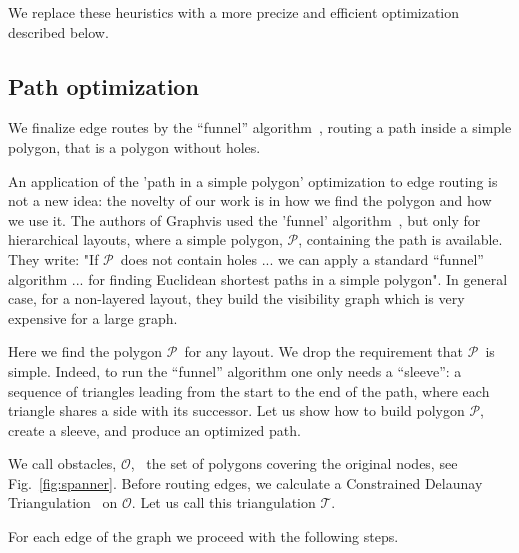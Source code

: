 \documentclass{gd-llncs}
\newcommand{\plg}{$\mathcal{P}$}
\begin{document}
We replace these heuristics with a more precize and efficient optimization described below.
\subsection*{Path optimization} {
We finalize edge routes by the “funnel” algorithm~\cite{chazelle1982theorem,hershberger1994computing}, routing a path inside a simple polygon, that is a polygon without holes.

An application of the 'path in a simple polygon' optimization to edge routing is not a new idea: the novelty of our work is in how we find the polygon and how we use it.
The authors of Graphvis used the 'funnel' algorithm~\cite{dobkin1997implementing}, but only for hierarchical layouts, where a simple polygon, \plg, containing the path is available. They write: "If \plg~does not contain holes ... we can apply a
standard “funnel” algorithm ... for finding Euclidean shortest paths in a simple polygon". In general case,
for a non-layered layout, they build the visibility graph which is very expensive for a large graph.

Here we find the polygon \plg~for any layout. We drop the requirement that \plg~is simple. Indeed, to run the “funnel” algorithm one only needs a “sleeve”: a sequence of triangles leading from the start to the end of the path, where each triangle shares a side with its successor. Let us show how to build polygon \plg, create a sleeve, and produce an optimized path.

We call obstacles, $\mathcal{O}$, ~the set of polygons covering the original nodes, see Fig.~\ref{fig:spanner}. Before routing edges, we calculate a Constrained Delaunay Triangulation~\cite{delaunay1934sphere} on $\mathcal{O}$. Let us call this triangulation $\mathcal{T}$.

For each edge of the graph we proceed with the following steps.

}
\end{document}
